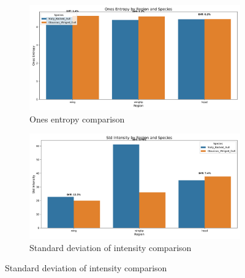 \documentclass[a4paper,12pt]{report}
\begin{document}
\begin{figure}[H]
    \begin{subfigure}[t]{0.48\textwidth}
        \centering
        \includegraphics[width=\textwidth]{images/appendix/Original/ones_entropy_comparison.png}
        \caption{Ones entropy comparison}
    \end{subfigure}
    \hfill
    \begin{subfigure}[t]{0.48\textwidth}
        \centering
        \includegraphics[width=\textwidth]{images/appendix/Original/std_intensity_comparison.png}
        \caption{Standard deviation of intensity comparison}
    \end{subfigure}
    
    \vspace{0.5cm}
    

\end{figure}
\end{document}
